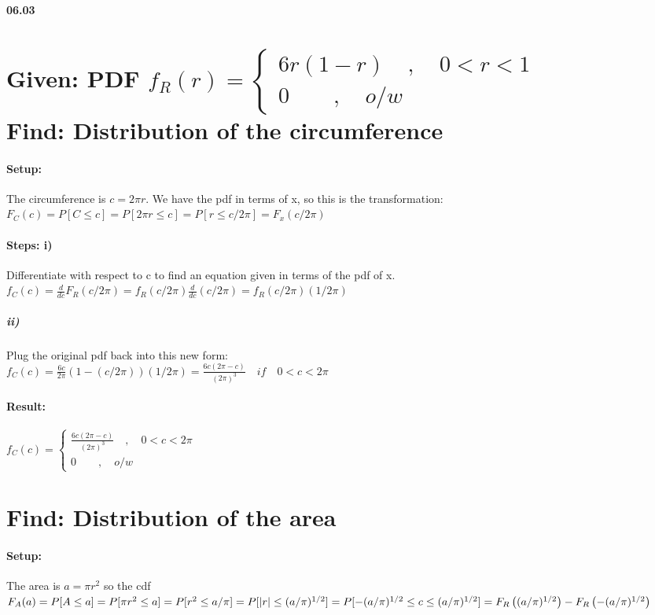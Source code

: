 
{\bf 06.03} 

\section*{Given: PDF $f_R(r)=\begin{cases} 6r(1-r) \quad ,\quad 0 < r < 1 \\ 0\quad  \quad ,\quad o/w \end{cases}$\\ Find: Distribution of the circumference}

\paragraph{Setup:} The circumference is $c=2\pi r$. We have the pdf in terms of x, so this is the transformation:\\ $F_C(c)=P[C\le c]=P[2\pi r\le c]=P[r \le c/2 \pi] = F_x(c/2 \pi)$

\paragraph{Steps: i)} Differentiate with respect to c to find an equation given in terms of the pdf of x.\\ $f_C(c)= \frac{d}{dc} F_R(c/2\pi)=f_R(c/2\pi)\frac{d}{dc}(c/2\pi)=f_R(c/2\pi)(1/2\pi)$


\subparagraph{ii)}Plug the original pdf back into this new form:\\ $f_C(c)= \frac{6c}{2\pi}(1-(c/2\pi))(1/2\pi)=\frac {6c(2\pi-c)}{(2\pi)^3} \quad if \quad 0<c<2\pi$

\paragraph{Result:} $f_C(c)=\begin{cases} \frac {6c(2\pi-c)}{(2\pi)^3} \quad , \quad 0<c<2\pi  \\ 0\quad  \quad ,\quad o/w \end{cases}$

\section*{Find: Distribution of the area }

\paragraph{Setup:} The area is $a=\pi{r}^{2}$ so the cdf $F_A(a)=P[A\le a]=P[\pi{r}^{2}\le a]=P[{r}^{2}\le a/\pi]\\=P[\left|r \right| \le (a/\pi)^{1/2} ]=P[-(a/\pi)^{1/2}\le c \le(a/\pi)^{1/2}]= F_R\left((a/\pi)^{1/2}\right)-F_R\left(-(a/\pi)^{1/2}\right)$

